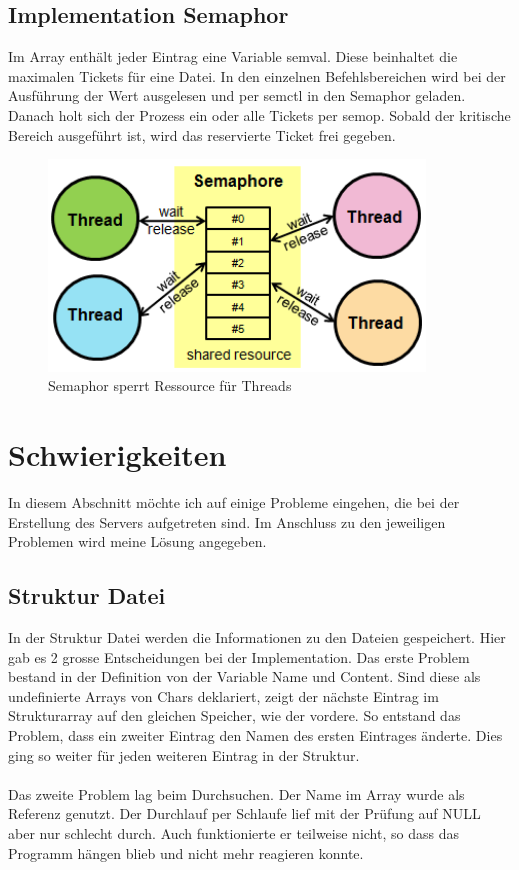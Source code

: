 \documentclass[12pt,a4paper,ngerman]{report}
\begin{document}
\subsection{Implementation Semaphor}
Im Array enthält jeder Eintrag eine Variable semval. Diese beinhaltet die maximalen Tickets für eine Datei. In den einzelnen Befehlsbereichen wird bei der Ausführung der Wert ausgelesen und per semctl in den Semaphor geladen. Danach holt sich der Prozess ein oder alle Tickets per semop. Sobald der kritische Bereich ausgeführt ist, wird das reservierte Ticket frei gegeben.
\begin{figure}[h!]
\centering
\includegraphics[width=10cm]{img/semaphore.png}
\caption{Semaphor sperrt Ressource für Threads\protect\footnotemark}
\end{figure}
\section{Schwierigkeiten}
In diesem Abschnitt möchte ich auf einige Probleme eingehen, die bei der Erstellung des Servers aufgetreten sind. Im Anschluss zu den jeweiligen Problemen wird meine Lösung angegeben.
\subsection{Struktur Datei}
In der Struktur Datei werden die Informationen zu den Dateien gespeichert. Hier gab es 2 grosse Entscheidungen bei der Implementation. Das erste Problem bestand in der Definition von der Variable Name und Content. Sind diese als undefinierte Arrays von Chars deklariert, zeigt der nächste Eintrag im Strukturarray auf den gleichen Speicher, wie der vordere. So entstand das Problem, dass ein zweiter Eintrag den Namen des ersten Eintrages änderte. Dies ging so weiter für jeden weiteren Eintrag in der Struktur.\\
\\
Das zweite Problem lag beim Durchsuchen. Der Name im Array wurde als Referenz genutzt. Der Durchlauf per Schlaufe lief mit der Prüfung auf NULL aber nur schlecht durch. Auch funktionierte er teilweise nicht, so dass das Programm hängen blieb und nicht mehr reagieren konnte.
\end{document}
